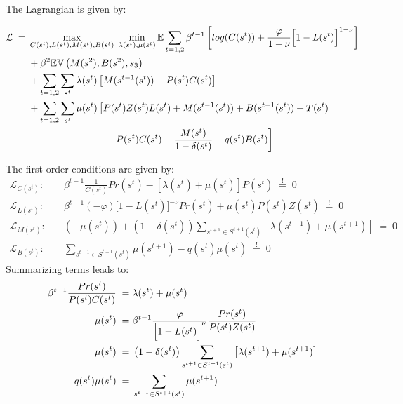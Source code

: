 \documentclass[a4paper, 12pt]{article}
\begin{document}
\bigskip%
\begin{Answer}%
	The Lagrangian is given by:%
	\begin{small}%
		\begin{align*}%
			\mathcal{L} \; = & \; \max_{C(s^t),L(s^t),M(s^t),B(s^t)} \; \min_{\lambda(s^t), \mu(s^t)} \mathbb{E} \sum_{t=1,2} \beta^{t-1} \left[log(C(s^t))+\frac{\varphi}{1-\nu} \Bigl[1-L(s^t)\Bigr]^{1-\nu}\right]\\%
			& \; + \beta^2 \mathbb{E} \mathbb{V} \left(M(s^2),B(s^2),s_3\right)\\%
			& \; + \sum_{t=1,2} \sum_{s^t} \lambda (s^t) \left[ M(s^{t-1}(s^t)) - P(s^t) C(s^t) \right]\\%
			& \; + \sum_{t=1,2} \sum_{s^t} \mu(s^t) \left[ P(s^t) Z(s^t) L(s^t) + M(s^{t-1}(s^t)) + B(s^{t-1}(s^t)) + T(s^t) \right.\\%
			& \; \quad \quad \quad \quad \quad \quad \quad \quad \left. - P(s^t) C(s^t) - \frac{M(s^t)}{1-\delta (s^t)} - q(s^t) B(s^t) \right]%
		\end{align*}%
	\end{small}%
	The first-order conditions are given by:%
	\begin{align}%
		\mathcal{L}_{C(s^t)}: \quad & \beta^{t-1} \frac{1}{C(s^t)} Pr(s^t) - \left[\lambda(s^t)+\mu(s^t)\right] P(s^t) \; \overset{!}{=} \; 0\\%
		\mathcal{L}_{L(s^t)}: \quad & \beta^{t-1} (-\varphi) \Big[1-L(s^t)\Big]^{-\nu} Pr(s^t) + \mu(s^t) P(s^t) Z(s^t) \; \overset{!}{=} \; 0\\%
		\mathcal{L}_{M(s^t)}: \quad & (-\mu(s^t)) + \left(1-\delta(s^t)\right) \sum_{s^{t+1} \in S^{t+1}(s^t)} \left[\lambda(s^{t+1}) + \mu(s^{t+1}) \right] \; \overset{!}{=} \; 0\\%
		\mathcal{L}_{B(s^t)}: \quad & \sum_{s^{t+1} \in S^{t+1}(s^t)} \mu(s^{t+1}) - q(s^t) \mu(s^t) \; \overset{!}{=} \; 0%
	\end{align}%
	Summarizing terms leads to:%
	\begin{align}%
		\beta^{t-1} \frac{Pr(s^t)}{P(s^t) C(s^t)} \; = & \; \lambda(s^t) + \mu(s^t)\\%
		\mu(s^t) \; = & \; \beta^{t-1} \frac{\varphi }{\Bigl[1-L(s^t)\Bigr]^\nu} \frac{Pr(s^t)}{P(s^t) Z(s^t)} \\%
		\mu(s^t) \; = & \; \left( 1-\delta(s^t) \right) \sum_{s^{t+1}\in S^{t+1}(s^t)} \left[\lambda(s^{t+1})+\mu(s^{t+1})\right]\\%
		q(s^t) \mu(s^t) \; = & \; \sum_{s^{t+1} \in S^{t+1}(s^t)} \mu(s^{t+1})%
	\end{align}%
\end{Answer}%
\end{document}
